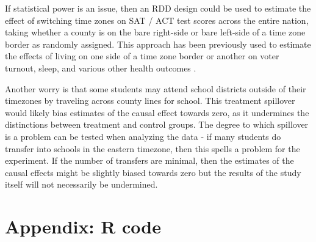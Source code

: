 \documentclass{article}\usepackage[]{graphicx}\usepackage[]{color}
\begin{document}
If statistical power is an issue, then an RDD design could be used to estimate the effect of switching time zones on SAT / ACT test scores across the entire nation, taking whether a county is on the bare right-side or bare left-side of a time zone border as randomly assigned.
This approach has been previously used to estimate the effects of living on one side of a time zone border or another on voter turnout, sleep, and various other health outcomes \parencites{Giuntella_2019}{Holbein_2019}.

Another worry is that some students may attend school districts outside of their timezones by traveling across county lines for school.
This treatment spillover would likely bias estimates of the causal effect towards zero, as it undermines the distinctions between treatment and control groups.
The degree to which spillover is a problem can be tested when analyzing the data - if many students do transfer into schools in the eastern timezone, then this spells a problem for the experiment. If the number of transfers are minimal, then the estimates of the causal effects might be slightly biased towards zero but the results of the study itself will not necessarily be undermined.

\newpage
\printbibliography
\section{Appendix: R code}


\end{document}
